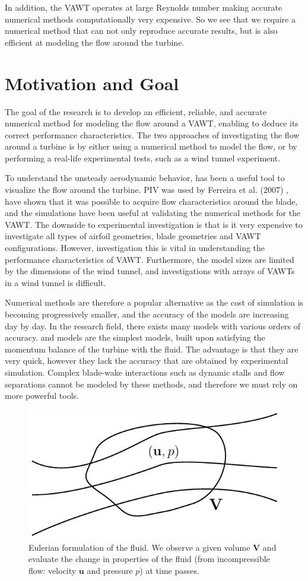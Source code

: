 In addition, the VAWT operates at large Reynolds number making accurate numerical methods computationally very expensive. So we see that we require a numerical method that can not only reproduce accurate results, but is also efficient at modeling the flow around the turbine.

\section{Motivation and Goal}
The goal of the research is to develop an efficient, reliable, and accurate numerical method for modeling the flow around a  VAWT, enabling to deduce its correct performance characteristics. The two approaches of investigating the flow around a turbine is by either using a numerical method to model the flow, or by performing a real-life experimental tests, such as a wind tunnel experiment.

To understand the unsteady aerodynamic behavior,  has been a useful tool to visualize the flow around the turbine. PIV was used by Ferreira et al. (2007) \cite{Ferreira2007a}, have shown that it was possible to acquire flow characteristics around the blade, and the simulations have been useful at validating the numerical methods for the VAWT. The downside to experimental investigation is that is it very expensive to investigate all types of airfoil geometries, blade geometries and VAWT configurations. However, investigation this is vital in understanding the performance characteristics of VAWT. Furthermore, the model sizes are limited by the dimensions of the wind tunnel, and investigations with arrays of VAWTs in a wind tunnel is difficult.

Numerical methods are therefore a popular alternative as the cost of simulation is becoming progressively smaller, and the accuracy of the models are increasing day by day. In the research field, there exists many models with various orders of accuracy.  and  models are the simplest models, built upon satisfying the momentum balance of the turbine with the fluid. The advantage is that they are very quick, however they lack the accuracy that are obtained by experimental simulation. Complex blade-wake interactions such as dynamic stalls and flow separations cannot be modeled by these methods, and therefore we must rely on more powerful tools.

	\begin{figure}[!t]
		\centering
		\includegraphics[width=0.4\linewidth]{figures/introduction/eulerianRF.pdf}
		\caption{Eulerian formulation of the fluid. We observe a given volume $\mathbf{V}$ and evaluate the change in properties of the fluid (from incompressible flow: velocity $\mathbf{u}$ and pressure $p$) at time passes.}
		\label{fig:eulerianRF}
	\end{figure}

